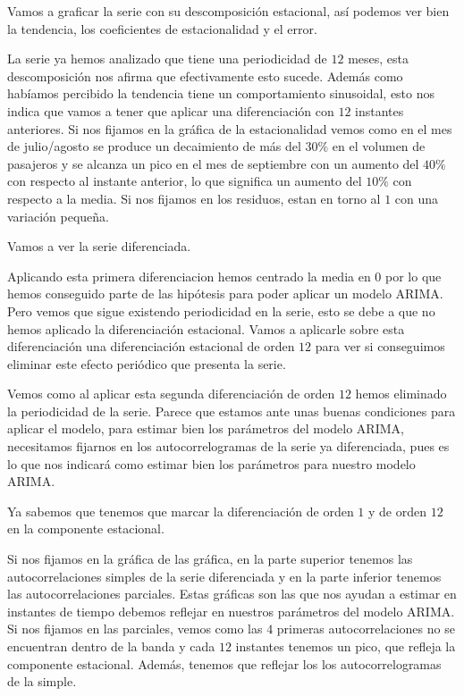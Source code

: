 \documentclass[11pt]{article}
\begin{document}
    Vamos a graficar la serie con su descomposición estacional, así podemos
ver bien la tendencia, los coeficientes de estacionalidad y el error.

    La serie ya hemos analizado que tiene una periodicidad de \(12\) meses,
esta descomposición nos afirma que efectivamente esto sucede. Además
como habíamos percibido la tendencia tiene un comportamiento sinusoidal,
esto nos indica que vamos a tener que aplicar una diferenciación con
\(12\) instantes anteriores. Si nos fijamos en la gráfica de la
estacionalidad vemos como en el mes de julio/agosto se produce un
decaimiento de más del \(30 \%\) en el volumen de pasajeros y se alcanza
un pico en el mes de septiembre con un aumento del \(40 \%\) con
respecto al instante anterior, lo que significa un aumento del \(10 \%\)
con respecto a la media. Si nos fijamos en los residuos, estan en torno
al \(1\) con una variación pequeña.

Vamos a ver la serie diferenciada.

    Aplicando esta primera diferenciacion hemos centrado la media en \(0\)
por lo que hemos conseguido parte de las hipótesis para poder aplicar un
modelo ARIMA. Pero vemos que sigue existendo periodicidad en la serie,
esto se debe a que no hemos aplicado la diferenciación estacional. Vamos
a aplicarle sobre esta diferenciación una diferenciación estacional de
orden \(12\) para ver si conseguimos eliminar este efecto periódico que
presenta la serie.

    Vemos como al aplicar esta segunda diferenciación de orden \(12\) hemos
eliminado la periodicidad de la serie. Parece que estamos ante unas
buenas condiciones para aplicar el modelo, para estimar bien los
parámetros del modelo ARIMA, necesitamos fijarnos en los
autocorrelogramas de la serie ya diferenciada, pues es lo que nos
indicará como estimar bien los parámetros para nuestro modelo ARIMA.

Ya sabemos que tenemos que marcar la diferenciación de orden \(1\) y de
orden \(12\) en la componente estacional.

    Si nos fijamos en la gráfica de las gráfica, en la parte superior
tenemos las autocorrelaciones simples de la serie diferenciada y en la
parte inferior tenemos las autocorrelaciones parciales. Estas gráficas
son las que nos ayudan a estimar en instantes de tiempo debemos reflejar
en nuestros parámetros del modelo ARIMA. Si nos fijamos en las
parciales, vemos como las \(4\) primeras autocorrelaciones no se
encuentran dentro de la banda y cada \(12\) instantes tenemos un pico,
que refleja la componente estacional. Además, tenemos que reflejar los
los autocorrelogramas de la simple.
\end{document}
